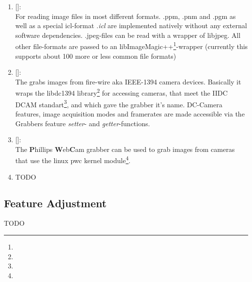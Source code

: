 \begin{enumerate}
\item {} []:\\
 For reading image files in most different formats. .ppm, .pnm and .pgm as well as a special icl-format \emph{.icl} are implemented natively without any external software dependencies. .jpeg-files can be read with a wrapper of libjpeg. All other file-formats are passed to an libImageMagic++\footnote{}-wrapper (currently this supports about 100 more or less common file formats)
%
\item {} []:\\
The  grabs images from fire-wire aka IEEE-1394 camera devices. Basically it wraps the libdc1394 library\footnote{} for accessing cameras, that meet the IIDC DCAM standart\footnote{}, and which gave the grabber it's name. DC-Camera features, image acquisition modes and framerates are made accessible via the Grabbers feature \emph{setter}- and \emph{getter}-functions.
%
\item {} []:\\
The \textbf{P}hillips \textbf{W}eb\textbf{C}am grabber can be used to grab images from cameras that use the linux pwc kernel module\footnote{}.
\item TODO
\end{enumerate}

\subsection{Feature Adjustment\label{sec:grabber-feature-adjustment}}
TODO
